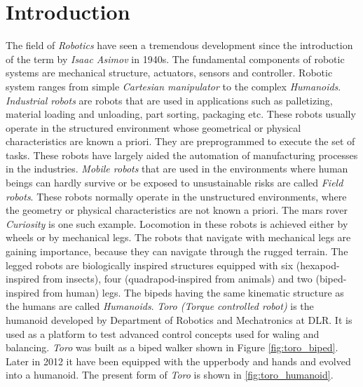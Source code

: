\chapter{Introduction}
\label{sec:einleitung}
The field of \emph{Robotics} have seen a tremendous development since the introduction of the term by \emph{Isaac Asimov} in 1940s. The fundamental components of robotic systems are mechanical structure, actuators, sensors and controller. Robotic system ranges from simple \emph{Cartesian manipulator} to the complex \emph{Humanoids}. \emph{Industrial robots} are robots that are used in applications such as palletizing, material loading and unloading, part sorting, packaging etc. These robots usually operate in the structured environment whose geometrical or physical characteristics are known a priori. They are preprogrammed to execute the set of tasks. These robots have largely aided the automation of manufacturing processes in the industries. \emph{Mobile robots} that are used in the environments where human beings can hardly survive or be exposed to unsustainable risks are called \emph{Field robots}. These robots normally operate in the unstructured environments, where the geometry or physical characteristics are not known a priori. The mars rover \emph{Curiosity} is one such example. Locomotion in these robots is achieved either by wheels or by mechanical legs. The robots that navigate with mechanical legs are gaining importance, because they can navigate through the rugged terrain. The legged robots are biologically inspired structures equipped with six (hexapod-inspired from insects), four (quadrapod-inspired from animals) and two (biped-inspired from human) legs. The bipeds having the same kinematic structure as the humans are called \emph{Humanoids}. \emph{Toro (Torque controlled robot)} is the humanoid developed by Department of Robotics and Mechatronics at DLR. It is used as a platform to test advanced control concepts used for waling and balancing. \emph{Toro} was built as a biped walker shown in Figure \ref{fig:toro_biped}. Later in 2012 it have been equipped with the upperbody and hands and evolved into a humanoid. The present form of \emph{Toro} is shown in \ref{fig:toro_humanoid}.
